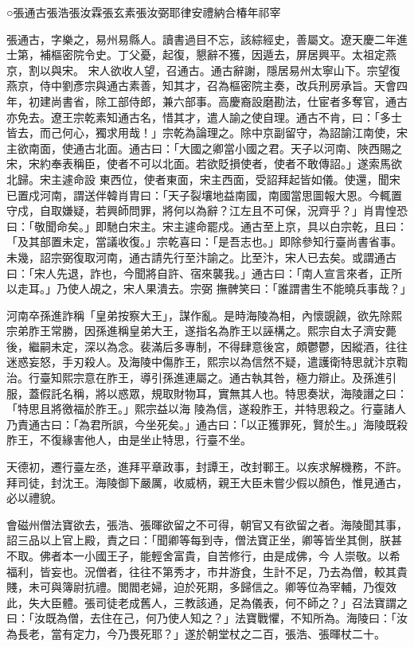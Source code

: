 
\begin{pinyinscope}

 ○張通古張浩張汝霖張玄素張汝弼耶律安禮納合椿年祁宰



 張通古，字樂之，易州易縣人。讀書過目不忘，該綜經史，善屬文。遼天慶二年進士第，補樞密院令史。丁父憂，起復，懇辭不獲，因遁去，屏居興平。太祖定燕京，割以與宋。
 宋人欲收人望，召通古。通古辭謝，隱居易州太寧山下。宗望復燕京，侍中劉彥宗與通古素善，知其才，召為樞密院主奏，改兵刑房承旨。天會四年，初建尚書省，除工部侍郎，兼六部事。高慶裔設磨勘法，仕宦者多奪官，通古亦免去。遼王宗乾素知通古名，惜其才，遣人諭之使自理。通古不肯，曰：「多士皆去，而己何心，獨求用哉！」宗乾為論理之。除中京副留守，為詔諭江南使，宋主欲南面，使通古北面。通古曰：「大國之卿當小國之君。天子以河南、陜西賜之宋，宋約奉表稱臣，使者不可以北面。若欲貶損使者，使者不敢傳詔。」遂索馬欲北歸。宋主遽命設
 東西位，使者東面，宋主西面，受詔拜起皆如儀。使還，聞宋已置戍河南，謂送伴韓肖胄曰：「天子裂壤地益南國，南國當思圖報大恩。今輒置守戍，自取嫌疑，若興師問罪，將何以為辭？江左且不可保，況齊乎？」肖胄惶恐曰：「敬聞命矣。」即馳白宋主。宋主遽命罷戍。通古至上京，具以白宗乾，且曰：「及其部置未定，當議收復。」宗乾喜曰：「是吾志也。」即除參知行臺尚書省事。未幾，詔宗弼復取河南，通古請先行至汴諭之。比至汴，宋人已去矣。或謂通古曰：「宋人先退，詐也，今聞將自許、宿來襲我。」通古曰：「南人宣言來者，正所以走耳。」乃使人覘之，宋人果潰去。宗弼
 撫髀笑曰：「誰謂書生不能曉兵事哉？」



 河南卒孫進詐稱「皇弟按察大王」，謀作亂。是時海陵為相，內懷覬覦，欲先除熙宗弟胙王常勝，因孫進稱皇弟大王，遂指名為胙王以誣構之。熙宗自太子濟安薨後，繼嗣未定，深以為念。裴滿后多專制，不得肆意後宮，頗鬱鬱，因縱酒，往往迷惑妄怒，手刃殺人。及海陵中傷胙王，熙宗以為信然不疑，遣護衛特思就汴京鞫治。行臺知熙宗意在胙王，導引孫進連屬之。通古執其咎，極力辯止。及孫進引服，蓋假託名稱，將以惑眾，規取財物耳，實無其人也。特思奏狀，海陵譖之曰：「特思且將徼福於胙王。」熙宗益以海
 陵為信，遂殺胙王，并特思殺之。行臺諸人乃責通古曰：「為君所誤，今坐死矣。」通古曰：「以正獲罪死，賢於生。」海陵既殺胙王，不復緣害他人，由是坐止特思，行臺不坐。



 天德初，遷行臺左丞，進拜平章政事，封譚王，改封鄆王。以疾求解機務，不許。拜司徒，封沈王。海陵御下嚴厲，收威柄，親王大臣未嘗少假以顏色，惟見通古，必以禮貌。



 會磁州僧法寶欲去，張浩、張暉欲留之不可得，朝官又有欲留之者。海陵聞其事，詔三品以上官上殿，責之曰：「聞卿等每到寺，僧法寶正坐，卿等皆坐其側，朕甚不取。佛者本一小國王子，能輕舍富貴，自苦修行，由是成佛，今
 人崇敬。以希福利，皆妄也。況僧者，往往不第秀才，市井游食，生計不足，乃去為僧，較其貴賤，未可與簿尉抗禮。閭閻老婦，迫於死期，多歸信之。卿等位為宰輔，乃復效此，失大臣體。張司徒老成舊人，三教該通，足為儀表，何不師之？」召法寶謂之曰：「汝既為僧，去住在己，何乃使人知之？」法寶戰懼，不知所為。海陵曰：「汝為長老，當有定力，今乃畏死耶？」遂於朝堂杖之二百，張浩、張暉杖二十。




\end{pinyinscope}
